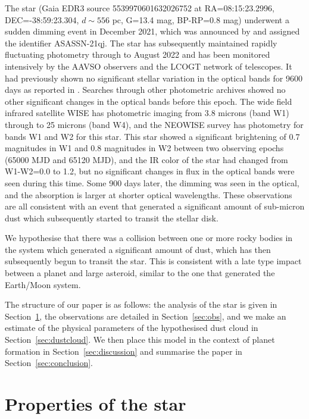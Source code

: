 \documentclass{aa}
\begin{document}
   The star (Gaia EDR3 source 5539970601632026752 at RA=08:15:23.2996, DEC=-38:59:23.304, $d\sim 556$ pc, G=13.4 mag, BP-RP=0.8 mag) underwent a sudden dimming event in December 2021, which was announced by \citet{RizzoSmith21} and assigned the identifier ASASSN-21qj.
   The star has subsequently maintained rapidly fluctuating photometry through to August 2022 \citep{RizzoSmith22} and has been monitored intensively by the AAVSO observers and the LCOGT network of telescopes.
   It had previously shown no significant stellar variation in the optical bands for 9600 days as reported in \citet{RizzoSmith21}.
   Searches through other photometric archives showed no other significant changes in the optical bands before this epoch.
   The wide field infrared satellite WISE has photometric imaging from 3.8 microns (band W1) through to 25 microns (band W4), and the NEOWISE survey has photometry for bands W1 and W2 for this star.
   This star showed a significant brightening of 0.7 magnitudes in W1 and 0.8 magnitudes in W2 between two observing epochs (65000 MJD and 65120 MJD), and the IR color of the star had changed from W1-W2=0.0 to 1.2, but no significant changes in flux in the optical bands were seen during this time.
   Some 900 days later, the dimming was seen in the optical, and the absorption is larger at shorter optical wavelengths.
   These observations are all consistent with an event that generated a significant amount of sub-micron dust which subsequently started to transit the stellar disk.

   We hypothesise that there was a collision between one or more rocky bodies in the system which generated a significant amount of dust, which has then subsequently begun to transit the star.
   This is consistent with a late type impact between a planet and large asteroid, similar to the one that generated the Earth/Moon system.

   The structure of our paper is as follows: the analysis of the star is given in Section~\ref{sec:star}, the observations are detailed in Section~\ref{sec:obs}, and we make an estimate of the physical parameters of the hypothesised dust cloud in Section~\ref{sec:dustcloud}.
   We then place this model in the context of planet formation in Section~\ref{sec:discussion} and summarise the paper in Section~\ref{sec:conclusion}.

\section{Properties of the star}\label{sec:star}
\end{document}
